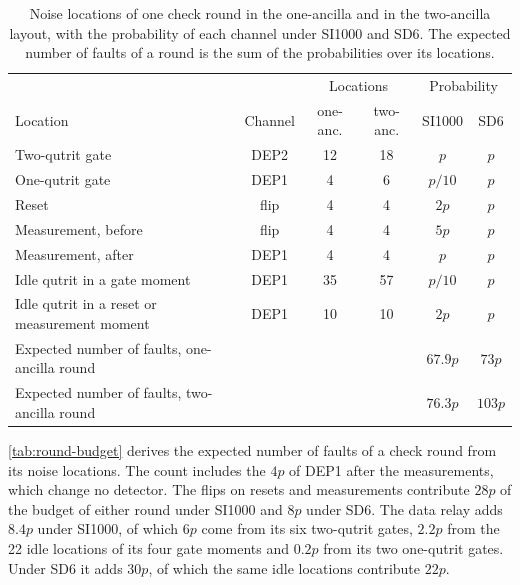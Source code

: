 \begin{table}[tb]
  \centering
  \begin{tabular}{l|c|c|c|c|c}
    \hline
    & & \multicolumn{2}{c|}{Locations} & \multicolumn{2}{c}{Probability} \\
    Location & Channel & one-anc. & two-anc. & SI1000 & SD6 \\
    \hline
    Two-qutrit gate & DEP2 & 12 & 18 & $p$ & $p$ \\
    One-qutrit gate & DEP1 & 4 & 6 & $p/10$ & $p$ \\
    Reset & flip & 4 & 4 & $2p$ & $p$ \\
    Measurement, before & flip & 4 & 4 & $5p$ & $p$ \\
    Measurement, after & DEP1 & 4 & 4 & $p$ & $p$ \\
    Idle qutrit in a gate moment & DEP1 & 35 & 57 & $p/10$ & $p$ \\
    Idle qutrit in a reset or measurement moment & DEP1 & 10 & 10 & $2p$ & $p$ \\
    \hline
    Expected number of faults, one-ancilla round & & & & $67.9p$ & $73p$ \\
    Expected number of faults, two-ancilla round & & & & $76.3p$ & $103p$ \\
    \hline
  \end{tabular}
  \caption{Noise locations of one check round in the one-ancilla and in the two-ancilla layout, with the probability of each channel under SI1000 and SD6. The expected number of faults of a round is the sum of the probabilities over its locations.}
  \label{tab:round-budget}
\end{table}

\autoref{tab:round-budget} derives the expected number of faults of a check round from its noise locations. The count includes the $4p$ of DEP1 after the measurements, which change no detector. The flips on resets and measurements contribute $28p$ of the budget of either round under SI1000 and $8p$ under SD6. The data relay adds $8.4p$ under SI1000, of which $6p$ come from its six two-qutrit gates, $2.2p$ from the 22 idle locations of its four gate moments and $0.2p$ from its two one-qutrit gates. Under SD6 it adds $30p$, of which the same idle locations contribute $22p$.

